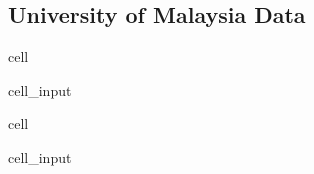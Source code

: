 \documentclass[letterpaper,10pt,english]{jupyterBook}
\begin{document}
\subsection{University of Malaysia Data}
\label{\detokenize{notebooks/replicating_paper:id1}}
\begin{sphinxuseclass}{cell}\begin{sphinxVerbatimInput}

\begin{sphinxuseclass}{cell_input}
\begin{sphinxVerbatim}[commandchars=\\\{\}]
  

  
\end{sphinxVerbatim}

\end{sphinxuseclass}\end{sphinxVerbatimInput}

\end{sphinxuseclass}
\begin{sphinxuseclass}{cell}\begin{sphinxVerbatimInput}

\begin{sphinxuseclass}{cell_input}
\begin{sphinxVerbatim}[commandchars=\\\{\}]
  \PYG{p}{[}\PYG{p}{[} \PYG{p}{]}\PYG{p}{]}
\end{sphinxVerbatim}

\end{sphinxuseclass}\end{sphinxVerbatimInput}

\end{sphinxuseclass}
\end{document}
